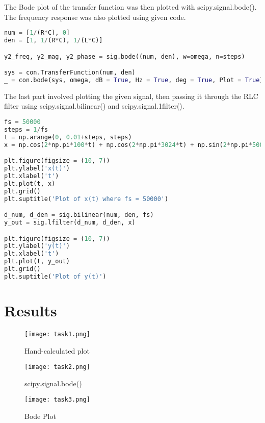 \documentclass[12pt]{report}
\begin{document}
The Bode plot of the transfer function was then plotted with scipy.signal.bode(). The frequency response was also plotted using given code.

\begin{lstlisting}[language=Python, caption= scipy.signal.bode()]
num = [1/(R*C), 0]
den = [1, 1/(R*C), 1/(L*C)]

y2_freq, y2_mag, y2_phase = sig.bode((num, den), w=omega, n=steps)

sys = con.TransferFunction(num, den)
_ = con.bode(sys, omega, dB = True, Hz = True, deg = True, Plot = True)
\end{lstlisting}

The last part involved plotting the given signal, then passing it through the RLC filter using scipy.signal.bilinear() and scipy.signal.1filter().

\begin{lstlisting}[language=Python, caption= Filter Output]
fs = 50000
steps = 1/fs
t = np.arange(0, 0.01+steps, steps)
x = np.cos(2*np.pi*100*t) + np.cos(2*np.pi*3024*t) + np.sin(2*np.pi*50000*t)

plt.figure(figsize = (10, 7))
plt.ylabel('x(t)')
plt.xlabel('t')
plt.plot(t, x)
plt.grid()
plt.suptitle('Plot of x(t) where fs = 50000')

d_num, d_den = sig.bilinear(num, den, fs)
y_out = sig.lfilter(d_num, d_den, x)

plt.figure(figsize = (10, 7))
plt.ylabel('y(t)')
plt.xlabel('t')
plt.plot(t, y_out)
plt.grid()
plt.suptitle('Plot of y(t)')
\end{lstlisting}


\section{Results}

\begin{figure}[htp]
    \centering
    \texttt{[image: task1.png]}
    \caption{Hand-calculated plot}
\end{figure}

\begin{figure}[htp]
    \centering
    \texttt{[image: task2.png]}
    \caption{scipy.signal.bode()}
\end{figure}

\begin{figure}[htp]
    \centering
    \texttt{[image: task3.png]}
    \caption{Bode Plot}
\end{figure}
\end{document}
